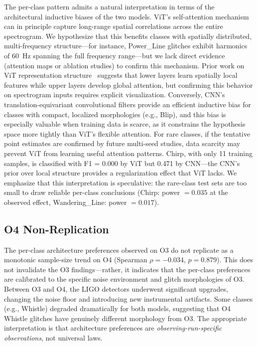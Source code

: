 \documentclass[12pt]{article}
\newcommand{\spearmanRhoOfour}{-0.034}
\newcommand{\spearmanPOfour}{0.879}
\begin{document}
The per-class pattern admits a natural interpretation in terms of the
architectural inductive biases of the two models.
ViT's self-attention mechanism can in principle capture long-range spatial
correlations across the entire spectrogram. We hypothesize that this benefits
classes with spatially distributed, multi-frequency structure---for instance,
Power\_Line glitches exhibit harmonics of 60~Hz spanning the full frequency
range---but we lack direct evidence (attention maps or ablation studies) to
confirm this mechanism.
Prior work on ViT representation structure~\citep{Raghu2021} suggests that
lower layers learn spatially local features while upper layers develop global
attention, but confirming this behavior on spectrogram inputs requires
explicit visualization.
Conversely, CNN's translation-equivariant convolutional filters provide an
efficient inductive bias for classes with compact, localized morphologies
(e.g., Blip), and this bias is especially valuable when training data is
scarce, as it constrains the hypothesis space more tightly than
ViT's flexible attention.
For rare classes, if the tentative point estimates are confirmed by future multi-seed studies, data scarcity may prevent ViT from learning useful attention patterns.
Chirp, with only 11 training samples, is classified with F1 = 0.000 by ViT
but 0.471 by CNN---the CNN's prior over local structure provides a
regularization effect that ViT lacks.
We emphasize that this interpretation is speculative: the rare-class test sets
are too small to draw reliable per-class conclusions
(Chirp: power $= 0.035$ at the observed effect,
Wandering\_Line: power $= 0.017$).

\subsection{O4 Non-Replication}

The per-class architecture preferences observed on O3 do not replicate as a
monotonic sample-size trend on O4 (Spearman $\rho = \spearmanRhoOfour$,
$p = \spearmanPOfour$).
This does not invalidate the O3 findings---rather, it indicates that the
per-class preferences are calibrated to the specific noise environment and
glitch morphologies of O3.
Between O3 and O4, the LIGO detectors underwent significant upgrades,
changing the noise floor and introducing new instrumental artifacts.
Some classes (e.g., Whistle) degraded dramatically for both models, suggesting
that O4 Whistle glitches have genuinely different morphology from O3.
The appropriate interpretation is that architecture preferences are
\emph{observing-run-specific observations}, not universal laws.
\end{document}
